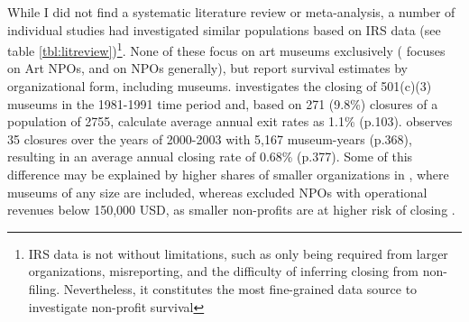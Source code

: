 \documentclass[12pt]{article}
\begin{document}
While I did not find a systematic literature review or meta-analysis, a number of individual studies had investigated similar populations based on IRS data (see table \ref{tbl:litreview})\footnote{IRS data is not without limitations, such as only being required from larger organizations, misreporting, and the difficulty of inferring closing from non-filing. Nevertheless, it constitutes the most fine-grained data source to investigate non-profit survival}.
None of these focus on art museums exclusively (\textcite{Hager_2001_vulnerability} focuses on Art NPOs, \textcite{Bowen_etal_1994_charitable} and \textcite{Gordon_etal_2013_insolvency} on NPOs generally), but report survival estimates by organizational form, including museums.
\textcite{Bowen_etal_1994_charitable} investigates the closing of 501(c)(3) museums in the 1981-1991 time period and, based on 271 (9.8\%) closures of a population of 2755, calculate average annual exit rates as 1.1\% (p.103).
\textcite{Gordon_etal_2013_insolvency} observes 35 closures over the years of 2000-2003 with 5,167 museum-years (p.368), resulting in an average annual closing rate of 0.68\% (p.377).
Some of this difference may be explained by higher shares of smaller organizations in \textcite{Bowen_etal_1994_charitable}, where museums of any size are included, whereas \textcite{Gordon_etal_2013_insolvency} excluded NPOs with operational revenues below 150,000 USD, as smaller non-profits are at higher risk of closing \parencite{Harrison_Laincz_2008_nonprofit,Helmig_Ingerfurth_Pinz_2013_nonprofit}.
\end{document}
